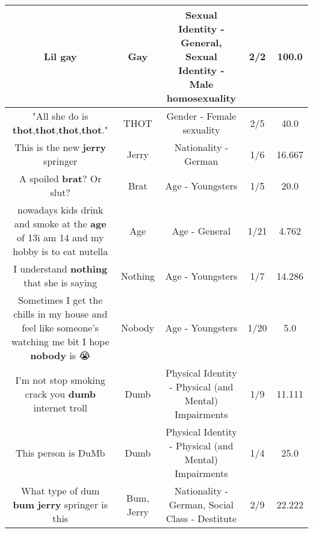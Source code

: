 \documentclass[11pt]{article}
\newlength\mylength
\begin{document}
\begin{center}
\begin{longtable}{|C{.65\mylength}|C{.30\mylength}|C{.12\mylength}|C{.12\mylength}|C{.12\mylength}|}
  \small Lil gay\normalsize   & Gay & Sexual Identity - General, Sexual Identity - Male homosexuality & 2/2 & 100.0 \\  \hline
  \small "All she do is \textbf{thot},\textbf{thot},\textbf{thot},\textbf{thot}."\normalsize   & THOT & Gender - Female sexuality & 2/5 & 40.0 \\  \hline
  \small This is the new \textbf{jerry} springer\normalsize   & Jerry & Nationality - German & 1/6 & 16.667 \\  \hline
  \small A spoiled \textbf{brat}? Or slut?\normalsize   & Brat & Age - Youngsters & 1/5 & 20.0 \\  \hline
  \small nowadays kids drink and smoke at the \textbf{age} of 13i am 14 and my hobby is to eat nutella   \normalsize   & Age & Age - General & 1/21 & 4.762 \\  \hline
  \small I understand \textbf{nothing} that she is saying\normalsize   & Nothing & Age - Youngsters & 1/7 & 14.286 \\  \hline
  \small Sometimes I get the chills in my house and feel like someone's watching me bit I hope \textbf{nobody} is 😭\normalsize   & Nobody & Age - Youngsters & 1/20 & 5.0 \\  \hline
  \small I'm not stop smoking crack you \textbf{dumb} internet troll\normalsize   & Dumb & Physical Identity - Physical (and Mental) Impairments & 1/9 & 11.111 \\  \hline
  \small This person is DuMb\normalsize   & Dumb & Physical Identity - Physical (and Mental) Impairments & 1/4 & 25.0 \\  \hline
  \small What type of dum \textbf{bum} \textbf{jerry} springer is this\normalsize   & Bum, Jerry & Nationality - German, Social Class - Destitute & 2/9 & 22.222 \\  \hline

\end{longtable}
\end{center}
\end{document}
